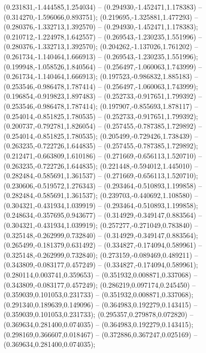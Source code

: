  (0.231831,-1.444585,1.254034) -- (0.294930,-1.452471,1.178383) -- (0.314270,-1.596066,0.893751);
 (0.219695,-1.325881,1.477293) -- (0.280376,-1.332713,1.392570) -- (0.294930,-1.452471,1.178383);
 (0.210712,-1.224978,1.642557) -- (0.269543,-1.230235,1.551996) -- (0.280376,-1.332713,1.392570);
 (0.204262,-1.137026,1.761202) -- (0.261734,-1.140464,1.666913) -- (0.269543,-1.230235,1.551996);
 (0.199948,-1.058526,1.840564) -- (0.256497,-1.060063,1.743999) -- (0.261734,-1.140464,1.666913);
 (0.197523,-0.986832,1.885183) -- (0.253546,-0.986478,1.787414) -- (0.256497,-1.060063,1.743999);
 (0.196854,-0.919823,1.897483) -- (0.252733,-0.917651,1.799392) -- (0.253546,-0.986478,1.787414);
 (0.197907,-0.855693,1.878117) -- (0.254014,-0.851825,1.780535) -- (0.252733,-0.917651,1.799392);
 (0.200737,-0.792781,1.826054) -- (0.257455,-0.787385,1.729892) -- (0.254014,-0.851825,1.780535);
 (0.205499,-0.729426,1.738439) -- (0.263235,-0.722726,1.644835) -- (0.257455,-0.787385,1.729892);
 (0.212471,-0.663809,1.610186) -- (0.271669,-0.656113,1.520710) -- (0.263235,-0.722726,1.644835);
 (0.221448,-0.594012,1.445010) -- (0.282484,-0.585691,1.361537) -- (0.271669,-0.656113,1.520710);
 (0.230606,-0.519572,1.276343) -- (0.293464,-0.510893,1.199858) -- (0.282484,-0.585691,1.361537);
 (0.239703,-0.440692,1.108580) -- (0.304321,-0.431934,1.039919) -- (0.293464,-0.510893,1.199858);
 (0.248634,-0.357695,0.943677) -- (0.314929,-0.349147,0.883564) -- (0.304321,-0.431934,1.039919);
 (0.257277,-0.271049,0.783840) -- (0.325148,-0.262999,0.732840) -- (0.314929,-0.349147,0.883564);
 (0.265499,-0.181379,0.631492) -- (0.334827,-0.174094,0.589961) -- (0.325148,-0.262999,0.732840);
 (0.273159,-0.089469,0.489211) -- (0.343809,-0.083177,0.457249) -- (0.334827,-0.174094,0.589961);
 (0.280114,0.003741,0.359653) -- (0.351932,0.008871,0.337068) -- (0.343809,-0.083177,0.457249);
 (0.286219,0.097174,0.245450) -- (0.359039,0.101053,0.231733) -- (0.351932,0.008871,0.337068);
 (0.291340,0.189639,0.149096) -- (0.364983,0.192279,0.143415) -- (0.359039,0.101053,0.231733);
 (0.295357,0.279878,0.072820) -- (0.369634,0.281400,0.074035) -- (0.364983,0.192279,0.143415);
 (0.298169,0.366607,0.018467) -- (0.372886,0.367247,0.025169) -- (0.369634,0.281400,0.074035);
